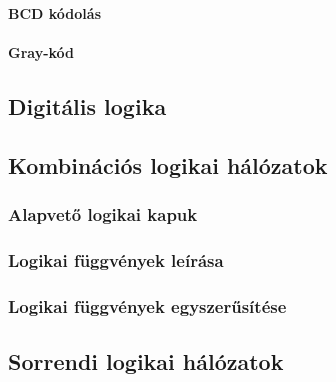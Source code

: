 \paragraph{BCD kódolás}
\paragraph{Gray-kód}
\subsection{Digitális logika}
\subsection{Kombinációs logikai hálózatok}



\subsubsection{Alapvető logikai kapuk}
\subsubsection{Logikai függvények leírása}
\subsubsection{Logikai függvények egyszerűsítése}
\subsection{Sorrendi logikai hálózatok}










\vspace{-1.5mm}
\newpage